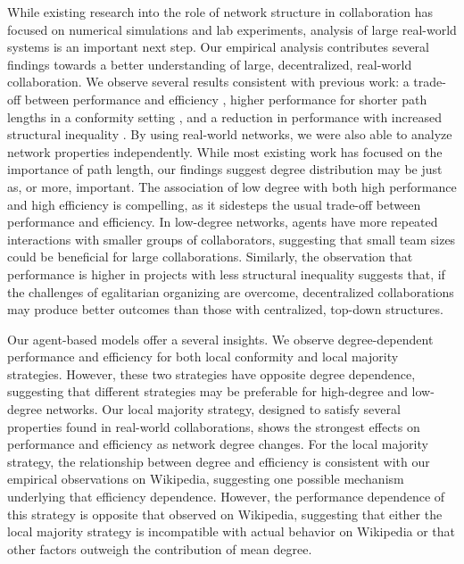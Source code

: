 \documentclass[letterpaper,twocolumn,10pt]{article}
\newcommand{\+}{\phantom{-}}
\begin{document}
While existing research into the role of network structure in collaboration
has focused on numerical simulations and lab experiments,
analysis of large real-world systems is an important next step.
Our empirical analysis contributes several findings towards a better
understanding of large, decentralized, real-world collaboration.
We observe several results consistent with previous work:
a trade-off between performance and efficiency
\cite{mason_propagation_2008,grim_scientific_2013},
higher performance for shorter path lengths in a conformity setting
\cite{barkoczi_social_2016},
and a reduction in performance with increased structural inequality
\cite{kearns_experiments_2012}.
By using real-world networks, we were also able to analyze network properties independently.
While most existing work has focused on the importance of path length,
our findings suggest degree distribution may be just as, or more, important.
The association of low degree with both high performance and high efficiency is compelling,
as it sidesteps the usual trade-off between performance and efficiency.
In low-degree networks, agents have more repeated interactions with smaller groups of collaborators, suggesting that small team sizes could be beneficial for large collaborations.
Similarly, the observation that performance is higher in projects with less structural inequality suggests that,
if the challenges of egalitarian organizing are overcome,
decentralized collaborations may produce better outcomes than those with centralized, top-down structures.

Our agent-based models offer a several insights.
We observe degree-dependent performance and efficiency
for both local conformity and local majority strategies.
However, these two strategies have opposite degree dependence,
suggesting that different strategies may be preferable for high-degree and low-degree
networks.
Our local majority strategy,
designed to satisfy several properties found in real-world collaborations,
shows the strongest effects on performance and efficiency as network degree changes.
For the local majority strategy,
the relationship between degree and efficiency is consistent with our
empirical observations on Wikipedia,
suggesting one possible mechanism underlying that efficiency dependence.
However, the performance dependence of this strategy
is opposite that observed on Wikipedia,
suggesting that either the local majority strategy
is incompatible with actual behavior on Wikipedia or
that other factors outweigh the contribution of mean degree.
\end{document}
